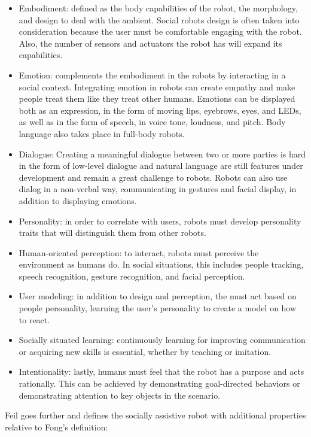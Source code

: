 \begin{itemize}
    \item Embodiment: defined as the body capabilities of the robot, the morphology, and design to deal with the ambient. Social robots design is often taken into consideration because the user must be comfortable engaging with the robot. Also, the number of sensors and actuators the robot has will expand its capabilities.
    \item Emotion: complements the embodiment in the robots by interacting in a social context. Integrating emotion in robots can create empathy and make people treat them like they treat other humans. Emotions can be displayed both as an expression, in the form of moving lips, eyebrows, eyes, and LEDs, as well as in the form of speech, in voice tone, loudness, and pitch. Body language also takes place in full-body robots.
    \item Dialogue: Creating a meaningful dialogue between two or more parties is hard in the form of low-level dialogue and natural language are still features under development and remain a great challenge to robots. Robots can also use dialog in a non-verbal way, communicating in gestures and facial display, in addition to displaying emotions.
    \item Personality: in order to correlate with users, robots must develop personality traits that will distinguish them from other robots.
    \item Human-oriented perception: to interact, robots must perceive the environment as humans do. In social situations, this includes people tracking, speech recognition, gesture recognition, and facial perception.
    \item User modeling: in addition to design and perception, the must act based on people personality, learning the user's personality to create a model on how to react.
    \item Socially situated learning: continuously learning for improving communication or acquiring new skills is essential, whether by teaching or imitation.
    \item Intentionality: lastly, humans must feel that the robot has a purpose and acts rationally. This can be achieved by demonstrating goal-directed behaviors or demonstrating attention to key objects in the scenario.
\end{itemize}

Feil goes further and defines the socially assistive robot with additional properties relative to Fong's definition:

